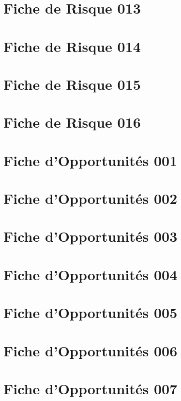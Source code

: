 \documentclass[asi]{picInsa}
\begin{document}
\chapter*{Fiche de Risque 013}

\chapter*{Fiche de Risque 014}

\chapter*{Fiche de Risque 015}

\chapter*{Fiche de Risque 016}


\chapter*{Fiche d'Opportunités 001}

\chapter*{Fiche d'Opportunités 002}

\chapter*{Fiche d'Opportunités 003}

\chapter*{Fiche d'Opportunités 004}

\chapter*{Fiche d'Opportunités 005}

\chapter*{Fiche d'Opportunités 006}

\chapter*{Fiche d'Opportunités 007}

\end{document}
